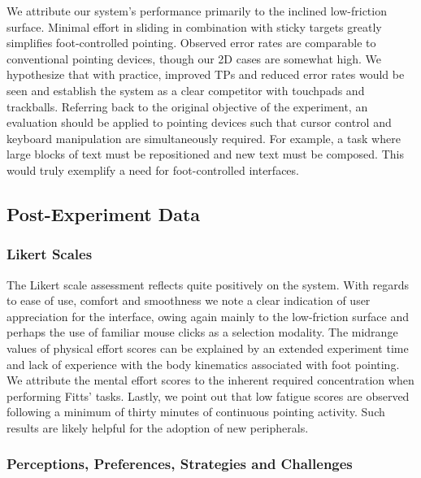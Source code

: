 \documentclass [12pt,letterpaper]{report}
\begin{document}
We attribute our system's performance primarily to the inclined low-friction surface. Minimal effort in sliding in combination with sticky targets greatly simplifies foot-controlled pointing. Observed error rates are comparable to conventional pointing devices, though our 2D cases are somewhat high. We hypothesize that with practice, improved TPs and reduced error rates would be seen and establish the system as a clear competitor with touchpads and trackballs. Referring back to the original objective of the experiment, an evaluation should be applied to pointing devices such that cursor control and keyboard manipulation are simultaneously required. For example, a task where large blocks of text must be repositioned and new text must be composed. This would truly exemplify a need for foot-controlled interfaces.

\subsection{Post-Experiment Data}

\subsubsection{Likert Scales}

The Likert scale assessment reflects quite positively on the system. With regards to ease of use, comfort and smoothness we note a clear indication of user appreciation for the interface, owing again mainly to the low-friction surface and perhaps the use of familiar mouse clicks as a selection modality. The midrange values of physical effort scores can be explained by an extended experiment time and lack of experience with the body kinematics associated with foot pointing. We attribute the mental effort scores to the inherent required concentration when performing Fitts' tasks. Lastly, we point out that low fatigue scores are observed following a minimum of thirty minutes of continuous pointing activity. Such results are likely helpful for the adoption of new peripherals.  

\subsubsection{Perceptions, Preferences, Strategies and Challenges}

\end{document}
